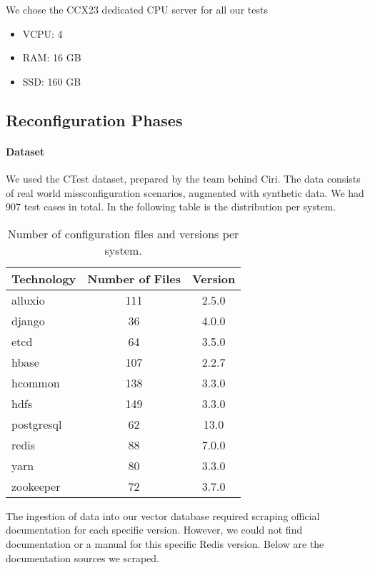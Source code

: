 We chose the CCX23 dedicated CPU server\cite{hetzner-online-gmbh-2025} for all our tests
\begin{itemize}
    \item VCPU: 4
    \item RAM: 16 GB
    \item SSD: 160 GB
\end{itemize}

\subsection{Reconfiguration Phases} \label{sec:exp_results} 

\paragraph{Dataset} 
We used the CTest dataset, prepared by the team behind Ciri\cite{Lian.2024}\cite{xlab-uiuc-2025}. The data consists of real world missconfiguration scenarios, augmented with synthetic data. We had 907 test cases in total. In the following table is the distribution per system.

\begin{table}[h]
    \centering
    \begin{tabular}{|l|c|c|}
        \hline
        \textbf{Technology} & \textbf{Number of Files} & \textbf{Version} \\
        \hline
        alluxio & 111 & 2.5.0 \\
        django & 36 & 4.0.0 \\
        etcd & 64 & 3.5.0 \\
        hbase & 107 & 2.2.7 \\
        hcommon & 138 & 3.3.0 \\
        hdfs & 149 & 3.3.0 \\
        postgresql & 62 & 13.0 \\
        redis & 88 & 7.0.0 \\
        yarn & 80 & 3.3.0 \\
        zookeeper & 72 & 3.7.0 \\
        \hline
    \end{tabular}
    \caption{Number of configuration files and versions per system.}
    \label{tab:technology_values}
\end{table}

The ingestion of data into our vector database required scraping official documentation for each specific version. However, we could not find documentation or a manual for this specific Redis version. Below are the documentation sources we scraped.

